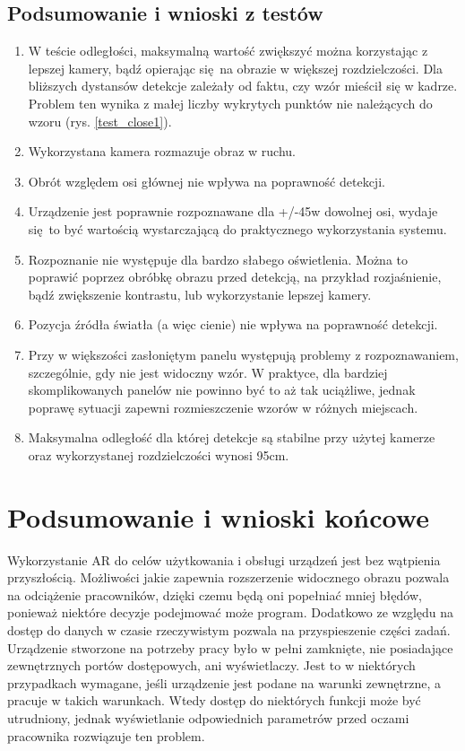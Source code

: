 \documentclass[12pt,twoside,polish]{article}
\begin{document}
\subsection{Podsumowanie i wnioski z testów}
\begin{enumerate}[label=\alph*), leftmargin=1.25cm]
\item W teście odległości, maksymalną wartość zwiększyć można korzystając z lepszej kamery, bądź opierając się na obrazie w większej rozdzielczości. Dla bliższych dystansów detekcje zależały od faktu, czy wzór mieścił się w kadrze. Problem ten wynika z małej liczby wykrytych punktów nie należących do wzoru (rys. \ref{test_close1}).
\item Wykorzystana kamera rozmazuje obraz w ruchu.
\item Obrót względem osi głównej nie wpływa na poprawność detekcji.
\item Urządzenie jest poprawnie rozpoznawane dla +/-45\degree w dowolnej osi, wydaje się to być wartością wystarczającą do praktycznego wykorzystania systemu.
\item Rozpoznanie nie występuje dla bardzo słabego oświetlenia. Można to poprawić poprzez obróbkę obrazu przed detekcją, na przykład rozjaśnienie, bądź zwiększenie kontrastu, lub wykorzystanie lepszej kamery.
\item Pozycja źródła światła (a więc cienie) nie wpływa na poprawność detekcji.
\item Przy w większości zasłoniętym panelu występują problemy z rozpoznawaniem, szczególnie, gdy nie jest widoczny wzór. W praktyce, dla bardziej skomplikowanych panelów nie powinno być to aż tak uciążliwe, jednak poprawę sytuacji zapewni rozmieszczenie wzorów w różnych miejscach.
\item Maksymalna odległość dla której detekcje są stabilne przy użytej kamerze oraz wykorzystanej rozdzielczości wynosi 95cm.
\end{enumerate}
\clearpage


\section{Podsumowanie i wnioski końcowe}
Wykorzystanie AR do celów użytkowania i obsługi urządzeń jest bez wątpienia przyszłością. Możliwości jakie zapewnia rozszerzenie widocznego obrazu pozwala na odciążenie pracowników, dzięki czemu będą oni popełniać mniej błędów, ponieważ niektóre decyzje podejmować może program. Dodatkowo ze względu na dostęp do danych w czasie rzeczywistym pozwala na przyspieszenie części zadań. Urządzenie stworzone na potrzeby pracy było w pełni zamknięte, nie posiadające zewnętrznych portów dostępowych, ani wyświetlaczy. Jest to w niektórych przypadkach wymagane, jeśli urządzenie jest podane na warunki zewnętrzne, a pracuje w takich warunkach. Wtedy dostęp do niektórych funkcji może być utrudniony, jednak wyświetlanie odpowiednich parametrów przed oczami pracownika rozwiązuje ten problem.
\end{document}
